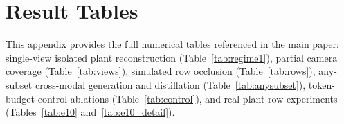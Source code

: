 \documentclass[10pt,twocolumn,letterpaper]{article}
\begin{document}
\appendix
\clearpage

\section{Result Tables}
\label{app:tables}

This appendix provides the full numerical tables referenced in the main paper: single-view isolated plant reconstruction (Table~\ref{tab:regime1}), partial camera coverage (Table~\ref{tab:views}), simulated row occlusion (Table~\ref{tab:rows}), any-subset cross-modal generation and distillation (Table~\ref{tab:anysubset}), token-budget control ablations (Table~\ref{tab:control}), and real-plant row experiments (Tables~\ref{tab:e10} and~\ref{tab:e10_detail}).
\end{document}
